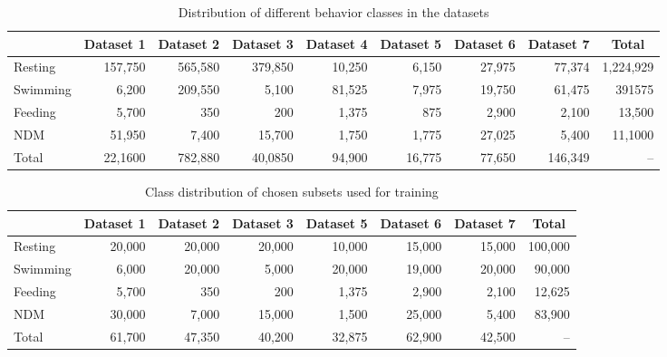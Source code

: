 \documentclass[conference]{IEEEtran}
\begin{document}
\begin{table}[tp!]
	\centering
	\caption{Distribution of different behavior classes in the datasets}
	\begin{tabular}{l r r r r r r r r}
	\hline
	& \textbf{Dataset 1} & \textbf{Dataset 2} & \textbf{Dataset 3} & \textbf{Dataset 4} & \textbf{Dataset 5} & \textbf{Dataset 6} & \textbf{Dataset 7} & \multicolumn{1}{c}{\textbf{Total}}\\
	\hline
	Resting & 157,750 & 565,580 & 379,850 & 10,250 & 6,150 & 27,975 & 77,374 & 1,224,929 \\
	Swimming & 6,200 & 209,550 & 5,100 & 81,525 & 7,975 & 19,750 & 61,475 & 391575 \\
	Feeding & 5,700 & 350 & 200 & 1,375 & 875 & 2,900 & 2,100 & 13,500 \\
	NDM & 51,950 & 7,400 & 15,700 & 1,750 & 1,775 & 27,025 & 5,400 & 11,1000 \\
	Total & 22,1600 & 782,880 & 40,0850 & 94,900 & 16,775 & 77,650 & 146,349 & -- \\
	\hline
	\end{tabular}
	\label{}
\end{table}

\begin{table}[tp!]
	\centering
	\caption{Class distribution of chosen subsets used for training}
	\begin{tabular}{l r r r r r r r}
	\hline
	& \textbf{Dataset 1} & \textbf{Dataset 2} & \textbf{Dataset 3} & \textbf{Dataset 5} & \textbf{Dataset 6} & \textbf{Dataset 7} & \multicolumn{1}{c}{\textbf{Total}}\\
	\hline
	Resting & 20,000 & 20,000 & 20,000 & 10,000 & 15,000 & 15,000 & 100,000 \\
	Swimming & 6,000 & 20,000 & 5,000 & 20,000 & 19,000 & 20,000 & 90,000 \\
	Feeding & 5,700 & 350 & 200 & 1,375 & 2,900 & 2,100 & 12,625 \\
	NDM & 30,000 & 7,000 & 15,000 & 1,500 & 25,000 & 5,400 & 83,900 \\
	Total & 61,700 & 47,350 & 40,200 & 32,875 & 62,900 & 42,500 & -- \\
	\hline
	\end{tabular}
	\label{}
\end{table}
\end{document}
